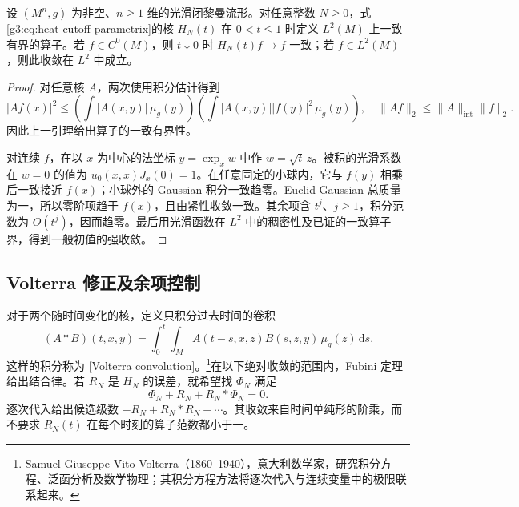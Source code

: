 \begin{lemma}\label{g3:lem:heat-parametrix-initial-value}
	设 \((M^n,g)\) 为非空、\(n\ge1\) 维的光滑闭黎曼流形。对任意整数 \(N\ge0\)，式\eqref{g3:eq:heat-cutoff-parametrix}的核 \(H_N(t)\) 在 \(0<t\le1\) 时定义 \(L^2(M)\) 上一致有界的算子。若 \(f\in C^0(M)\)，则 \(t\downarrow0\) 时 \(H_N(t)f\to f\) 一致；若 \(f\in L^2(M)\)，则此收敛在 \(L^2\) 中成立。
\end{lemma}
\begin{proof}
	对任意核 \(A\)，两次使用积分估计得到
	\[
		|Af(x)|^2\le
		\left(\int|A(x,y)|\,\mu_g(y)\right)
		\left(\int|A(x,y)||f(y)|^2\,\mu_g(y)\right),
		\quad \|Af\|_2\le\|A\|_{\mathrm{int}}\|f\|_2.
	\]
	因此上一引理给出算子的一致有界性。

	对连续 \(f\)，在以 \(x\) 为中心的法坐标 \(y=\exp_xw\) 中作 \(w=\sqrt t\,z\)。被积的光滑系数在 \(w=0\) 的值为 \(u_0(x,x)J_x(0)=1\)。在任意固定的小球内，它与 \(f(y)\) 相乘后一致接近 \(f(x)\)；小球外的 Gaussian 积分一致趋零。Euclid Gaussian 总质量为一，所以零阶项趋于 \(f(x)\)，且由紧性收敛一致。其余项含 \(t^j\)、\(j\ge1\)，积分范数为 \(O(t^j)\)，因而趋零。最后用光滑函数在 \(L^2\) 中的稠密性及已证的一致算子界，得到一般初值的强收敛。
\end{proof}

\subsection{Volterra 修正及余项控制}
\label{g3:subsec:1602:04}
对于两个随时间变化的核，定义只积分过去时间的卷积
\begin{equation}\label{g3:eq:heat-volterra-convolution}
	(A*B)(t,x,y)=\int_0^t\int_M
	A(t-s,x,z)B(s,z,y)\,\mu_g(z)\,\mathrm ds.
\end{equation}
这样的积分称为 [Volterra convolution]。\footnote{Samuel Giuseppe Vito Volterra（1860--1940），意大利数学家，研究积分方程、泛函分析及数学物理；其积分方程方法将逐次代入与连续变量中的极限联系起来。}在以下绝对收敛的范围内，Fubini 定理给出结合律。若 \(R_N\) 是 \(H_N\) 的误差，就希望找 \(\Phi_N\) 满足
\[
	\Phi_N+R_N+R_N*\Phi_N=0.
\]
逐次代入给出候选级数 \(-R_N+R_N*R_N-\cdots\)。其收敛来自时间单纯形的阶乘，而不要求 \(R_N(t)\) 在每个时刻的算子范数都小于一。

